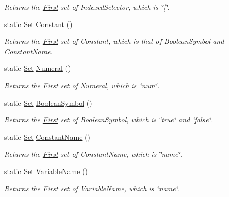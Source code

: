 \begin{DoxyCompactItemize}
\begin{DoxyCompactList}\small\item\em Returns the \hyperlink{classFirst}{First} set of IndexedSelector, which is \char`\"{}\mbox{[}\char`\"{}. \item\end{DoxyCompactList}\item 
static \hyperlink{classSet}{Set} \hyperlink{classFirst_a7a9a1bfc65dabe8a153af1dcacd502d3}{Constant} ()
\begin{DoxyCompactList}\small\item\em Returns the \hyperlink{classFirst}{First} set of Constant, which is that of BooleanSymbol and ConstantName. \item\end{DoxyCompactList}\item 
static \hyperlink{classSet}{Set} \hyperlink{classFirst_aa0fa7fe6f11e3ead3307f35b6e29abaa}{Numeral} ()
\begin{DoxyCompactList}\small\item\em Returns the \hyperlink{classFirst}{First} set of Numeral, which is \char`\"{}num\char`\"{}. \item\end{DoxyCompactList}\item 
static \hyperlink{classSet}{Set} \hyperlink{classFirst_ad54b225baf52d7c2a020615d50549af1}{BooleanSymbol} ()
\begin{DoxyCompactList}\small\item\em Returns the \hyperlink{classFirst}{First} set of BooleanSymbol, which is \char`\"{}true\char`\"{} and \char`\"{}false\char`\"{}. \item\end{DoxyCompactList}\item 
static \hyperlink{classSet}{Set} \hyperlink{classFirst_a36b5dd323041edb5e4a2043776034331}{ConstantName} ()
\begin{DoxyCompactList}\small\item\em Returns the \hyperlink{classFirst}{First} set of ConstantName, which is \char`\"{}name\char`\"{}. \item\end{DoxyCompactList}\item 
static \hyperlink{classSet}{Set} \hyperlink{classFirst_a43688eea61d648abe3ed2c006c712ff8}{VariableName} ()
\begin{DoxyCompactList}\small\item\em Returns the \hyperlink{classFirst}{First} set of VariableName, which is \char`\"{}name\char`\"{}. \item\end{DoxyCompactList}\item 

\end{DoxyCompactItemize}
